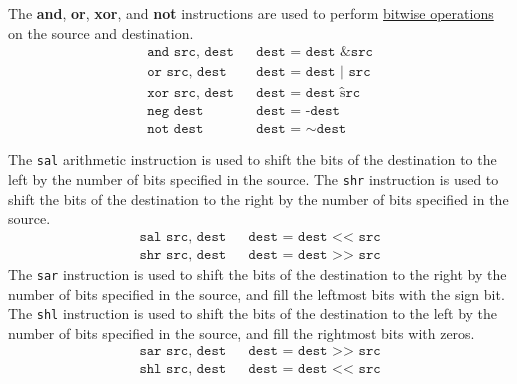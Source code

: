   \begin{definition}[Bitwise]
    \label{def:bitwise}
    The \textbf{and}, \textbf{or}, \textbf{xor}, and \textbf{not} instructions are used to perform \hyperref[def:bitwise-operations]{bitwise operations} on the source and destination. 
    \begin{align*}
      \texttt{and src, dest} && \texttt{dest = dest \& src}  \\
      \texttt{or src, dest} && \texttt{dest = dest | src}  \\
      \texttt{xor src, dest} && \texttt{dest = dest \^ src}  \\
      \texttt{neg dest} && \texttt{dest = -dest}  \\
      \texttt{not dest} && \texttt{dest = $\sim$dest}  
    \end{align*}
  \end{definition}

  \begin{definition}
    \label{def:arithmetic-and-logical-bit-shift}
    The \texttt{sal} arithmetic instruction is used to shift the bits of the destination to the left by the number of bits specified in the source. The \texttt{shr} instruction is used to shift the bits of the destination to the right by the number of bits specified in the source.
    \begin{align*}
      \texttt{sal src, dest} && \texttt{dest = dest << src}  \\
      \texttt{shr src, dest} && \texttt{dest = dest >> src}
    \end{align*}
    The \texttt{sar} instruction is used to shift the bits of the destination to the right by the number of bits specified in the source, and fill the leftmost bits with the sign bit. The \texttt{shl} instruction is used to shift the bits of the destination to the left by the number of bits specified in the source, and fill the rightmost bits with zeros. 
    \begin{align*}
      \texttt{sar src, dest} && \texttt{dest = dest >> src}  \\
      \texttt{shl src, dest} && \texttt{dest = dest << src}
    \end{align*}
  \end{definition}

